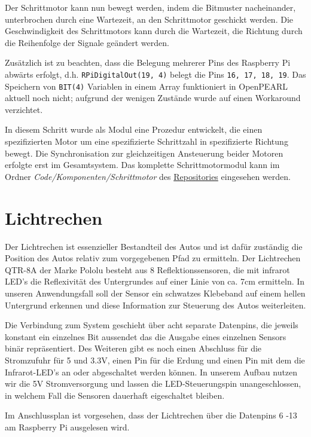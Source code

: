Der Schrittmotor kann nun bewegt werden, indem die Bitmuster nacheinander, unterbrochen durch eine Wartezeit, an den Schrittmotor geschickt werden. 
Die Geschwindigkeit des Schrittmotors kann durch die Wartezeit, die Richtung durch die Reihenfolge der Signale geändert werden.

Zusätzlich ist zu beachten, dass die Belegung mehrerer Pins des Raspberry Pi abwärts erfolgt, d.h. \texttt{RPiDigitalOut(19, 4)} belegt die Pins \texttt{16, 17, 18, 19}. 
Das Speichern von \texttt{BIT(4)} Variablen in einem Array funktioniert in OpenPEARL aktuell noch nicht; aufgrund der wenigen Zustände wurde auf einen Workaround verzichtet.

In diesem Schritt wurde als Modul eine Prozedur entwickelt, die einen spezifizierten Motor um eine spezifizierte Schrittzahl in spezifizierte Richtung bewegt. Die Synchronisation zur gleichzeitigen Ansteuerung beider Motoren erfolgte erst im Gesamtsystem. Das komplette Schrittmotormodul kann im Ordner \emph{Code/Komponenten/Schrittmotor} des \href{https://github.com/OpenPearl-HFUWPV1718/SensorCar}{Repositories} eingesehen werden.\\


\section{Lichtrechen}
Der Lichtrechen ist essenzieller Bestandteil des Autos und ist dafür zuständig die Position des Autos relativ zum vorgegebenen Pfad zu ermitteln. Der Lichtrechen QTR-8A der Marke Pololu besteht aus 8 Reflektionssensoren, die mit infrarot LED’s die Reflexivität des Untergrundes auf einer Linie von ca. 7cm ermitteln. In unseren Anwendungsfall soll der Sensor ein schwatzes Klebeband auf einem hellen Untergrund erkennen und diese Information zur Steuerung des Autos weiterleiten. 

Die Verbindung zum System geschieht über acht separate Datenpins, die jeweils konstant ein einzelnes Bit aussendet das die Ausgabe eines einzelnen Sensors binär repräsentiert. Des Weiteren gibt es noch einen Abschluss für die Stromzufuhr für 5 und 3.3V, einen Pin für die Erdung und einen Pin mit dem die Infrarot-LED’s an oder abgeschaltet werden können. In unserem Aufbau nutzen wir die 5V Stromversorgung und lassen die LED-Steuerungspin unangeschlossen, in welchem Fall die Sensoren dauerhaft eigeschaltet bleiben. 

Im Anschlussplan ist vorgesehen, dass der Lichtrechen über die Datenpins 6 -13 am Raspberry Pi ausgelesen wird.


